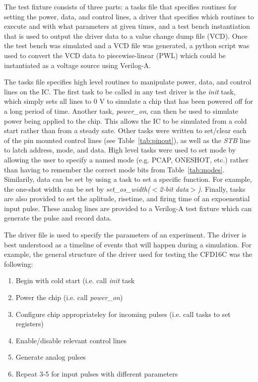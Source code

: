 \documentclass[12pt,oneside,final]{siuethesis}
\theoremstyle{definition}
\begin{document}
\par The test fixture consists of three parts: a tasks file that specifies routines for setting the power, data, and control lines, a driver that specifies which routines to execute and with what parameters at given times, and a test bench instantiation that is used to output the driver data to a value change dump file (VCD). Once the test bench was simulated and a VCD file was generated, a python script was used to convert the VCD data to piecewise-linear (PWL) which could be instantiated as a voltage source using Verilog-A.
\par The tasks file specifies high level routines to manipulate power, data, and control lines on the IC. The first task to be called in any test driver is the \emph{init} task, which simply sets all lines to 0 V to simulate a chip that has been powered off for a long period of time. Another task, \emph{power\_on}, can then be used to simulate power being applied to the chip. This allows the IC to be simulated from a cold start rather than from a steady sate. Other tasks were written to set/clear each of the pin mounted control lines (see Table~\ref{tab:pinout}), as well as the \emph{STB} line to latch address, mode, and data. High level tasks were used to set mode by allowing the user to specify a named mode (e.g. PCAP, ONESHOT, etc.) rather than having to remember the correct mode bits from Table~\ref{tab:modes}. Similarily, data can be set by using a task to set a specific function. For example, the one-shot width can be set by \emph{set\_os\_width($<$2-bit data$>$)}. Finally, tasks are also provided to set the aplitude, risetime, and firing time of an expoenential input pulse. These analog lines are provided to a Verilog-A test fixture which can generate the pulse and record data.
\par The driver file is used to specify the parameters of an experiment. The driver is best understood as a timeline of events that will happen during a simulation. For example, the general structure of the driver used for testing the CFD16C was the following:

\begin{enumerate}
\item Begin with cold start (i.e. call \emph{init} task
\item Power the chip (i.e. call \emph{power\_on})
\item Configure chip appropriateley for incoming pulses (i.e. call tasks to set registers)
\item Enable/disable relevant control lines
\item Generate analog pulses
\item Repeat 3-5 for input pulses with different parameters
\end{enumerate}
\end{document}
